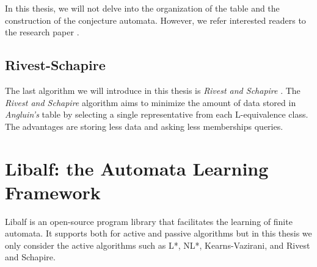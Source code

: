 In this thesis, we will not delve into the organization of the table and the construction of the conjecture automata. 
However, we refer interested readers to the research paper \cite*{Neider2014ApplicationsOA}. 

\subsection{Rivest-Schapire}
The last algorithm we will introduce in this thesis is \textit{Rivest and Schapire} \cite*{rivest1989inference}.
The \textit{Rivest and Schapire} algorithm aims to minimize the amount of data stored in \textit{Angluin's} table by 
selecting a single representative from each L-equivalence class.
The advantages are storing less data and asking less memberships queries.
\section{Libalf: the Automata Learning Framework}\label{section:libalf}
Libalf \cite*{bollig2010libalf} is an open-source program library that facilitates the learning of finite automata. 
It supports both for active and passive algorithms but 
in this thesis we only consider the active algorithms such as L*, NL*, Kearns-Vazirani, and Rivest and Schapire.

